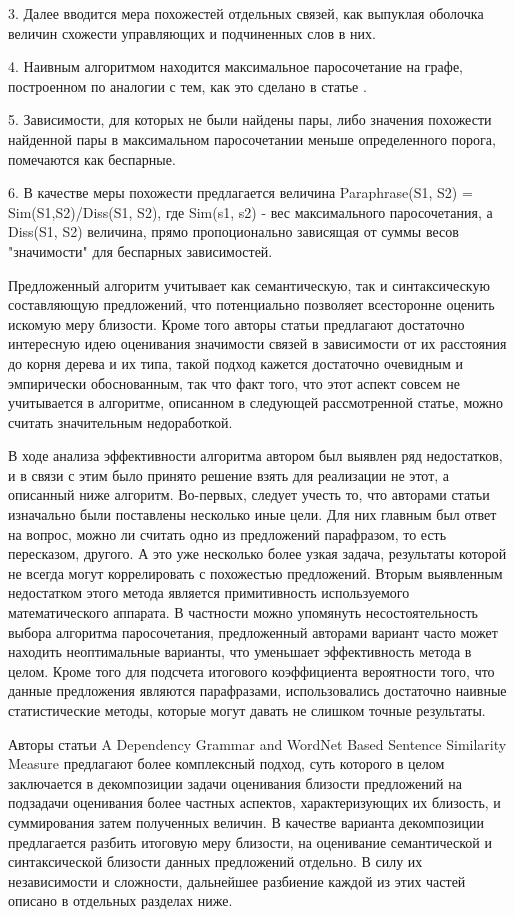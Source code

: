 3. Далее вводится мера похожестей отдельных связей, как выпуклая оболочка 
величин схожести управляющих и подчиненных слов в них.

4. Наивным алгоритмом находится максимальное паросочетание на графе,
построенном по аналогии с тем, как это сделано в статье \cite{wordnetSim}.

5. Зависимости, для которых не были найдены пары, либо значения похожести
найденной пары в максимальном паросочетании меньше определенного порога,
помечаются как беспарные.

6. В качестве меры похожести предлагается величина 
Paraphrase(S1, S2) = Sim(S1,S2)/Diss(S1, S2), 
где Sim(s1, s2) - вес максимального паросочетания,
а Diss(S1, S2) величина, прямо пропоционально зависящая от 
суммы весов "значимости" для беспарных зависимостей.

Предложенный алгоритм учитывает как семантическую, так и синтаксическую составляющую
предложений, что потенциально позволяет всесторонне оценить искомую меру близости.
Кроме того авторы статьи предлагают достаточно интересную идею оценивания значимости связей
в зависимости от их расстояния до корня дерева и  их типа, такой подход кажется достаточно очевидным
и эмпирически обоснованным, так что факт того, что этот аспект совсем не учитывается в алгоритме,
описанном в следующей рассмотренной статье, можно считать значительным недоработкой.

В ходе анализа эффективности алгоритма автором был выявлен ряд недостатков,
и в связи с этим было принято решение взять для реализации не этот, а описанный ниже алгоритм.
Во-первых, следует учесть то, что авторами статьи изначально были поставлены несколько иные
цели. Для них главным был ответ на вопрос, можно ли считать одно из предложений парафразом,
то есть пересказом, другого. А это уже несколько более узкая задача,
результаты которой не всегда могут коррелировать с похожестью предложений.
Вторым выявленным недостатком этого метода является примитивность
используемого математического аппарата. В частности можно
упомянуть несостоятельность выбора алгоритма паросочетания, 
предложенный авторами вариант часто может находить неоптимальные варианты,
что уменьшает эффективность метода в целом. Кроме того для
подсчета итогового коэффициента вероятности того, что данные предложения
являются парафразами, использовались достаточно наивные статистические методы,
которые могут давать не слишком точные результаты.

Авторы статьи A Dependency Grammar and WordNet Based Sentence Similarity Measure\cite{complexSim}
предлагают более комплексный подход, суть которого в целом заключается в декомпозиции задачи
оценивания близости предложений на подзадачи оценивания более частных аспектов, 
характеризующих их близость, и суммирования затем полученных величин.
В качестве варианта декомпозиции предлагается разбить итоговую меру близости, 
на оценивание семантической и синтаксической близости данных предложений отдельно.
В силу их независимости и сложности, дальнейшее разбиение
каждой из этих частей описано в отдельных разделах ниже.

